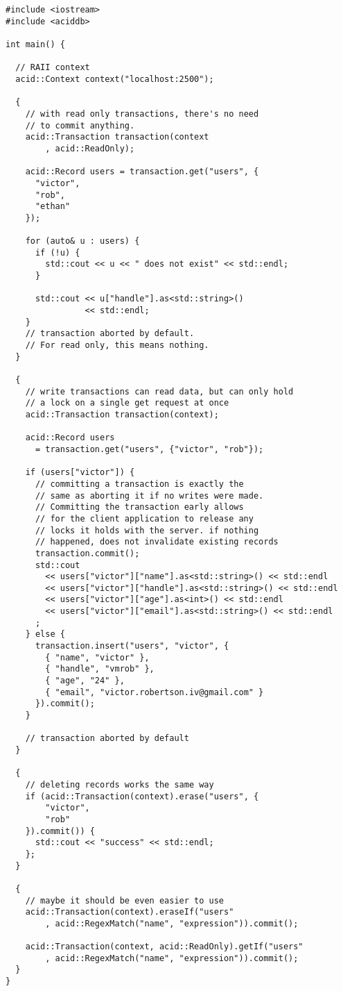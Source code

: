 \documentclass[a4paper]{report}
\begin{document}
	\begin{lstlisting}
#include <iostream>
#include <aciddb>

int main() {

  // RAII context
  acid::Context context("localhost:2500");
  
  {
	// with read only transactions, there's no need
	// to commit anything.
	acid::Transaction transaction(context
	    , acid::ReadOnly);

	acid::Record users = transaction.get("users", {
	  "victor",
	  "rob",
	  "ethan"
	});

	for (auto& u : users) {
	  if (!u) {
		std::cout << u << " does not exist" << std::endl;
	  }

	  std::cout << u["handle"].as<std::string>()
				<< std::endl;
	}
	// transaction aborted by default.
	// For read only, this means nothing.
  }
  
  {
	// write transactions can read data, but can only hold
	// a lock on a single get request at once
	acid::Transaction transaction(context);

	acid::Record users
	  = transaction.get("users", {"victor", "rob"});

	if (users["victor"]) {
	  // committing a transaction is exactly the
	  // same as aborting it if no writes were made.
	  // Committing the transaction early allows
	  // for the client application to release any
	  // locks it holds with the server. if nothing
	  // happened, does not invalidate existing records
	  transaction.commit();
	  std::cout
		<< users["victor"]["name"].as<std::string>() << std::endl
		<< users["victor"]["handle"].as<std::string>() << std::endl
		<< users["victor"]["age"].as<int>() << std::endl
		<< users["victor"]["email"].as<std::string>() << std::endl
	  ;
	} else {
	  transaction.insert("users", "victor", {
		{ "name", "victor" },
		{ "handle", "vmrob" },
		{ "age", "24" },
		{ "email", "victor.robertson.iv@gmail.com" }
	  }).commit();
	}

	// transaction aborted by default
  }

  {
	// deleting records works the same way
	if (acid::Transaction(context).erase("users", {
		"victor",
		"rob"
	}).commit()) {
	  std::cout << "success" << std::endl;
	};
  }

  {
	// maybe it should be even easier to use
	acid::Transaction(context).eraseIf("users"
		, acid::RegexMatch("name", "expression")).commit();

	acid::Transaction(context, acid::ReadOnly).getIf("users"
		, acid::RegexMatch("name", "expression")).commit();
  }
}
\end{lstlisting}
\end{document}
